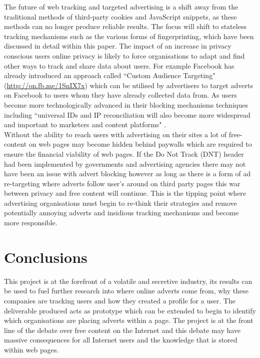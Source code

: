 \documentclass[12pt]{article}
\begin{document}
The future of web tracking and targeted advertising is a shift away from the traditional methods of third-party cookies and JavaScript snippets, as these methods can no longer produce reliable results. The focus will shift to stateless tracking mechanisms such as the various forms of fingerprinting, which have been discussed in detail within this paper. The impact of an increase in privacy conscious users online privacy is likely to force organisations to adapt and find other ways to track and share data about users. For example Facebook has already introduced an approach called ``Custom Audience  Targeting" (\url{http://on.fb.me/1SnIX7x}) which can be utilised by advertisers to target adverts on Facebook to users whom they have already collected data from. As users become more technologically advanced in their blocking mechanisms techniques including ``universal IDs and IP reconciliation will also become more widespread and important to marketers and content platforms" \parencite{tippingPoint}. \\

Without the ability to reach users with advertising on their sites a lot of free-content on web pages may become hidden behind paywalls which are required to ensure the financial viability of web pages. If the Do Not Track (DNT) header had been implemented by governments  and advertising agencies there may not have been an issue with advert blocking however as long as there is a form of ad re-targeting where adverts follow user's around on third party pages this war between privacy and free content will continue. This is the tipping point where advertising organisations must begin to re-think their strategies and remove potentially annoying adverts and insidious tracking mechanisms and become more responsible. 

\pagebreak

\section{Conclusions}
This project is at the forefront of a volatile and secretive industry, its results can be used to fuel further research into where online adverts come from, why these companies are tracking users and how they created a profile for a user. The deliverable produced acts as prototype which can be extended to begin to identify which organisations are placing adverts within a page. The project is at the front line of the debate over free content on the Internet and this debate may have massive consequences for all Internet users and the knowledge that is stored within web pages. \\
\end{document}

